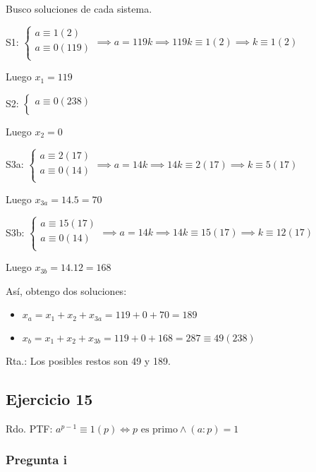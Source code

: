 Busco soluciones de cada sistema.

S1: $ \begin{cases}
    a \equiv 1(2) \\
    a \equiv 0(119) \\
\end{cases} \implies a = 119k \implies 119k \equiv 1(2) \implies k \equiv 1(2) $

Luego $ x_1 = 119 $

S2: $ \begin{cases}
    a \equiv 0(238) \\
\end{cases} $

Luego $ x_2 = 0 $

S3a: $ \begin{cases}
    a \equiv 2(17) \\
    a \equiv 0(14) \\
\end{cases} \implies a = 14k \implies 14k \equiv 2(17) \implies k \equiv 5(17) $

Luego $ x_{3a} = 14.5 = 70 $

S3b: $ \begin{cases}
    a \equiv 15(17) \\
    a \equiv 0(14) \\
\end{cases} \implies a = 14k \implies 14k \equiv 15(17) \implies k \equiv 12(17) $

Luego $ x_{3b} = 14.12 = 168 $

Así, obtengo dos soluciones:
\begin{itemize}
    \item $ x_a = x_1 + x_2 + x_{3a} = 119+0+70 = 189 $
    \item $ x_b = x_1 + x_2 + x_{3b} = 119+0+168 = 287 \equiv 49(238) $
\end{itemize}

Rta.: Los posibles restos son 49 y 189.

\subsection{Ejercicio 15}

Rdo. PTF: $ a^{p-1} \equiv 1(p) \iff p \text{ es primo} \wedge (a:p)=1 $

\subsubsection{Pregunta i}

